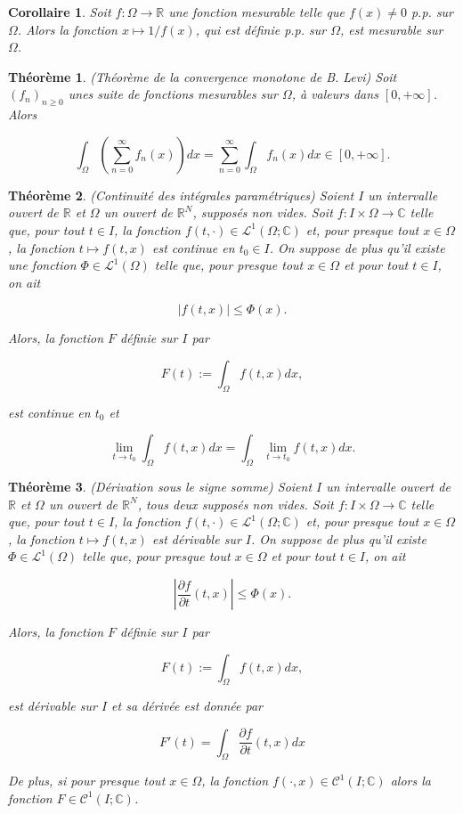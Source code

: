 \documentclass[10pt,a4paper,oneside]{article}
\newtheorem{theoreme}{Théorème}
\newtheorem{corollaire}{Corollaire}
\begin{document}
\begin{corollaire}
Soit $f : \Omega \to \mathbb{R}$ une fonction mesurable telle que $f(x) \neq 0$ p.p. sur $\Omega$. Alors la fonction $x \mapsto 1/f(x)$, qui est définie p.p. sur $\Omega$, est mesurable sur $\Omega$.
\end{corollaire}

\begin{theoreme}
(Théorème de la convergence monotone de B. Levi)
Soit $(f_n)_{n \geq 0}$ unes suite de fonctions mesurables sur $\Omega$, à valeurs dans $[0,+\infty]$. Alors

\[ \int_\Omega \left( \sum_{n = 0}^\infty f_n(x) \right) dx = \sum_{n = 0}^\infty \int_\Omega f_n(x) dx \in [0,+\infty]. \]
\end{theoreme}

\begin{theoreme}
(Continuité des intégrales paramétriques)
Soient $I$ un intervalle ouvert de $\mathbb{R}$ et $\Omega$ un ouvert de $\mathbb{R}^N$, supposés non vides. Soit $f : I \times \Omega \to \mathbb{C}$ telle que, pour tout $t \in I$, la fonction $f(t,\cdot) \in \mathcal{L}^1(\Omega;\mathbb{C})$ et, pour presque tout $x \in \Omega$, la fonction $t \mapsto f(t,x)$ est continue en $t_0 \in I$. On suppose de plus qu'il existe une fonction $\Phi \in \mathcal{L}^1(\Omega)$ telle que, pour presque tout $x \in \Omega$ et pour tout $t \in I$, on ait

\[ |f(t,x)| \leq \Phi(x). \]

Alors, la fonction $F$ définie sur $I$ par

\[ F(t) := \int_\Omega f(t,x) dx, \]

est continue en $t_0$ et

\[ \lim_{t \to t_0} \int_\Omega f(t,x) dx = \int_\Omega \lim_{t \to t_0} f(t,x) dx. \]
\end{theoreme}

\begin{theoreme}
(Dérivation sous le signe somme)
Soient $I$ un intervalle ouvert de $\mathbb{R}$ et $\Omega$ un ouvert de $\mathbb{R}^N$, tous deux supposés non vides. Soit $f : I \times \Omega \to \mathbb{C}$ telle que, pour tout $t \in I$, la fonction $f(t,\cdot) \in \mathcal{L}^1(\Omega;\mathbb{C})$ et, pour presque tout $x \in \Omega$, la fonction $t \mapsto f(t,x)$ est dérivable sur $I$. On suppose de plus qu'il existe $\Phi \in \mathcal{L}^1(\Omega)$ telle que, pour presque tout $x \in \Omega$ et pour tout $t \in I$, on ait

\[ \left|\dfrac{\partial f}{\partial t}(t,x)\right| \leq \Phi(x). \]

Alors, la fonction $F$ définie sur $I$ par

\[ F(t) := \int_\Omega f(t,x) dx, \]

est dérivable sur $I$ et sa dérivée est donnée par

\[ F'(t) = \int_\Omega \dfrac{\partial f}{\partial t}(t,x) dx \]

De plus, si pour presque tout $x \in \Omega$, la fonction $f(\cdot,x) \in \mathcal{C}^1(I;\mathbb{C})$ alors la fonction $F \in \mathcal{C}^1(I;\mathbb{C})$.
\end{theoreme}
\end{document}
